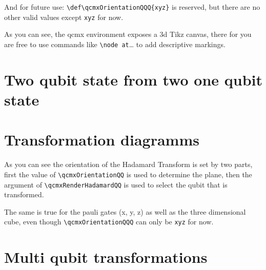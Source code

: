 \documentclass{article}
\begin{document}
And for future use: \lstinline|\def\qcmxOrientationQQQ{xyz}| is reserved, but there are no other valid values except \lstinline|xyz| for now.

As you can see, the qcmx environment exposes a 3d Tikz canvas,
there for you are free to use commands like \lstinline|\node at|\dots{} to add descriptive markings.

\pagebreak
\section*{Two qubit state from two one qubit state}

\resizebox{\textwidth}{!}{
  \hspace{-17cm}
  
  \hspace{8cm}
}

\pagebreak
\section*{Transformation diagramms}

\resizebox{\textwidth}{!}{
  \hspace{-20cm}
  
  \hspace{5cm}
}

\pagebreak

\resizebox{\textwidth}{!}{
  \hspace{-20cm}
  
  \hspace{5cm}
}

As you can see the orientation of the Hadamard Transform is set by two parts,
first the value of \lstinline|\qcmxOrientationQQ| is used to determine the plane,
then the argument of \lstinline|\qcmxRenderHadamardQQ| is used to select the qubit that is transformed.

The same is true for the pauli gates (x, y, z) as well as the three dimensional cube,
even though \lstinline|\qcmxOrientationQQQ| can only be \lstinline|xyz| for now.

\pagebreak
\section*{Multi qubit transformations}

\resizebox{\textwidth}{!}{
  \hspace{-20cm}
  
  \hspace{5cm}
}
\end{document}
